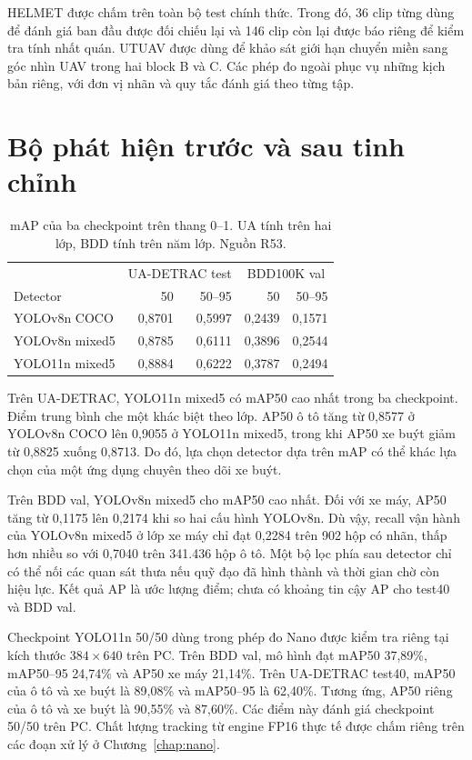 HELMET được chấm trên toàn bộ test chính thức. Trong đó, 36 clip từng dùng để đánh giá ban đầu được đối chiếu lại và 146 clip còn lại được báo riêng để kiểm tra tính nhất quán. UTUAV được dùng để khảo sát giới hạn chuyển miền sang góc nhìn UAV trong hai block B và C. Các phép đo ngoài phục vụ những kịch bản riêng, với đơn vị nhãn và quy tắc đánh giá theo từng tập.

\section{Bộ phát hiện trước và sau tinh chỉnh}
\begin{table}[htbp]\centering\small
\caption{mAP của ba checkpoint trên thang 0--1. UA tính trên hai lớp, BDD tính trên năm lớp. Nguồn R53.}\label{tab:ap}
\begin{tabular}{lrrrr}\hline
& \multicolumn{2}{c}{UA-DETRAC test} & \multicolumn{2}{c}{BDD100K val}\\
Detector & 50 & 50--95 & 50 & 50--95\\\hline
YOLOv8n COCO & 0,8701 & 0,5997 & 0,2439 & 0,1571\\
YOLOv8n mixed5 & 0,8785 & 0,6111 & 0,3896 & 0,2544\\
YOLO11n mixed5 & 0,8884 & 0,6222 & 0,3787 & 0,2494\\\hline
\end{tabular}
\end{table}
Trên UA-DETRAC, YOLO11n mixed5 có mAP50 cao nhất trong ba checkpoint. Điểm trung bình che một khác biệt theo lớp. AP50 ô tô tăng từ 0,8577 ở YOLOv8n COCO lên 0,9055 ở YOLO11n mixed5, trong khi AP50 xe buýt giảm từ 0,8825 xuống 0,8713. Do đó, lựa chọn detector dựa trên mAP có thể khác lựa chọn của một ứng dụng chuyên theo dõi xe buýt.

Trên BDD val, YOLOv8n mixed5 cho mAP50 cao nhất. Đối với xe máy, AP50 tăng từ 0,1175 lên 0,2174 khi so hai cấu hình YOLOv8n. Dù vậy, recall vận hành của YOLOv8n mixed5 ở lớp xe máy chỉ đạt 0,2284 trên 902 hộp có nhãn, thấp hơn nhiều so với 0,7040 trên 341.436 hộp ô tô. Một bộ lọc phía sau detector chỉ có thể nối các quan sát thưa nếu quỹ đạo đã hình thành và thời gian chờ còn hiệu lực. Kết quả AP là ước lượng điểm; chưa có khoảng tin cậy AP cho test40 và BDD val.

Checkpoint YOLO11n 50/50 dùng trong phép đo Nano được kiểm tra riêng tại kích thước $384\times640$ trên PC. Trên BDD val, mô hình đạt mAP50 37,89\%, mAP50--95 24,74\% và AP50 xe máy 21,14\%. Trên UA-DETRAC test40, mAP50 của ô tô và xe buýt là 89,08\% và mAP50--95 là 62,40\%. Tương ứng, AP50 riêng của ô tô và xe buýt là 90,55\% và 87,60\%. Các điểm này đánh giá checkpoint 50/50 trên PC. Chất lượng tracking từ engine FP16 thực tế được chấm riêng trên các đoạn xử lý ở Chương~\ref{chap:nano}.


